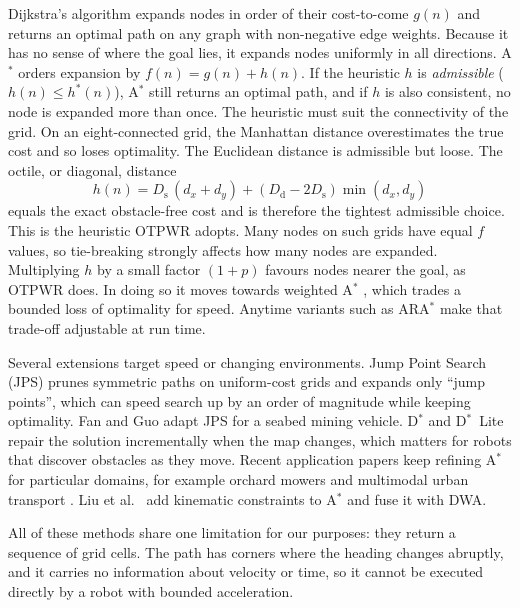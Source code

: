 \documentclass[11pt,a4paper]{article}
\begin{document}
Dijkstra's algorithm \citep{dijkstra1959note} expands nodes in order of their
cost-to-come $g(n)$ and returns an optimal path on any graph with
non-negative edge weights. Because it has no sense of where the goal lies, it
expands nodes uniformly in all directions. A$^\ast$ \citep{hart1968formal}
orders expansion by $f(n)=g(n)+h(n)$. If the heuristic $h$ is
\emph{admissible} ($h(n)\le h^\ast(n)$), A$^\ast$ still returns an optimal
path, and if $h$ is also consistent, no node is expanded more than once. The
heuristic must suit the connectivity of the grid. On an eight-connected grid,
the Manhattan distance overestimates the true cost and so loses optimality.
The Euclidean distance is admissible but loose. The octile, or diagonal,
distance
\begin{equation}
  h(n)=D_{\mathrm{s}}\,(d_x+d_y)+(D_{\mathrm{d}}-2D_{\mathrm{s}})\min(d_x,d_y)
\end{equation}
equals the exact obstacle-free cost and is therefore the tightest admissible
choice. This is the heuristic OTPWR adopts. Many nodes on such grids have
equal $f$ values, so tie-breaking strongly affects how many nodes are
expanded. Multiplying $h$ by a small factor $(1+p)$ favours nodes nearer the
goal, as OTPWR does. In doing so it moves towards weighted A$^\ast$
\citep{pohl1970heuristic}, which trades a bounded loss of optimality for
speed. Anytime variants such as ARA$^\ast$ \citep{likhachev2003ara} make that
trade-off adjustable at run time.

Several extensions target speed or changing environments. Jump Point Search
(JPS) \citep{harabor2011online} prunes symmetric paths on uniform-cost grids
and expands only ``jump points'', which can speed search up by an order of
magnitude while keeping optimality. Fan and Guo \citep{fan2023improved}
adapt JPS for a seabed mining vehicle. D$^\ast$ \citep{stentz1994optimal} and
D$^\ast$~Lite \citep{koenig2002dstar} repair the solution incrementally when
the map changes, which matters for robots that discover obstacles as they
move. Recent application papers keep refining A$^\ast$ for particular
domains, for example orchard mowers \citep{zhang2024orchard} and multimodal
urban transport \citep{feng2023improved}. Liu et al.\ \citep{liu2023kinematically}
add kinematic constraints to A$^\ast$ and fuse it with DWA.

All of these methods share one limitation for our purposes: they return a
sequence of grid cells. The path has corners where the heading changes
abruptly, and it carries no information about velocity or time, so it cannot
be executed directly by a robot with bounded acceleration.
\end{document}

